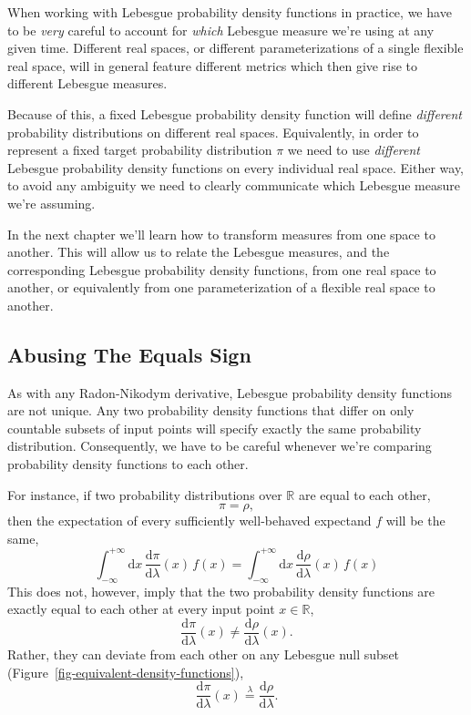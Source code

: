 \documentclass[
  letterpaper,
  DIV=11,
  numbers=noendperiod]{scrartcl}
\begin{document}
When working with Lebesgue probability density functions in practice, we
have to be \emph{very} careful to account for \emph{which} Lebesgue
measure we're using at any given time. Different real spaces, or
different parameterizations of a single flexible real space, will in
general feature different metrics which then give rise to different
Lebesgue measures.

Because of this, a fixed Lebesgue probability density function will
define \emph{different} probability distributions on different real
spaces. Equivalently, in order to represent a fixed target probability
distribution \(\pi\) we need to use \emph{different} Lebesgue
probability density functions on every individual real space. Either
way, to avoid any ambiguity we need to clearly communicate which
Lebesgue measure we're assuming.

In the next chapter we'll learn how to transform measures from one space
to another. This will allow us to relate the Lebesgue measures, and the
corresponding Lebesgue probability density functions, from one real
space to another, or equivalently from one parameterization of a
flexible real space to another.

\subsection{Abusing The Equals Sign}\label{abusing-the-equals-sign}

As with any Radon-Nikodym derivative, Lebesgue probability density
functions are not unique. Any two probability density functions that
differ on only countable subsets of input points will specify exactly
the same probability distribution. Consequently, we have to be careful
whenever we're comparing probability density functions to each other.

For instance, if two probability distributions over \(\mathbb{R}\) are
equal to each other, \[
\pi = \rho,
\] then the expectation of every sufficiently well-behaved expectand
\(f\) will be the same, \[
\int_{-\infty}^{+\infty} \mathrm{d} x \,
\frac{ \mathrm{d} \pi }{ \mathrm{d} \lambda}(x)
\, f(x)
=
\int_{-\infty}^{+\infty} \mathrm{d} x \,
\frac{ \mathrm{d} \rho }{ \mathrm{d} \lambda}(x)
\, f(x)
\] This does not, however, imply that the two probability density
functions are exactly equal to each other at every input point
\(x \in \mathbb{R}\), \[
\frac{ \mathrm{d} \pi }{ \mathrm{d} \lambda}(x)
\ne
\frac{ \mathrm{d} \rho }{ \mathrm{d} \lambda}(x).
\] Rather, they can deviate from each other on any Lebesgue null subset
(Figure~\ref{fig-equivalent-density-functions}), \[
\frac{ \mathrm{d} \pi }{ \mathrm{d} \lambda}(x)
\overset{\lambda}{=}
\frac{ \mathrm{d} \rho }{ \mathrm{d} \lambda}.
\]
\end{document}
